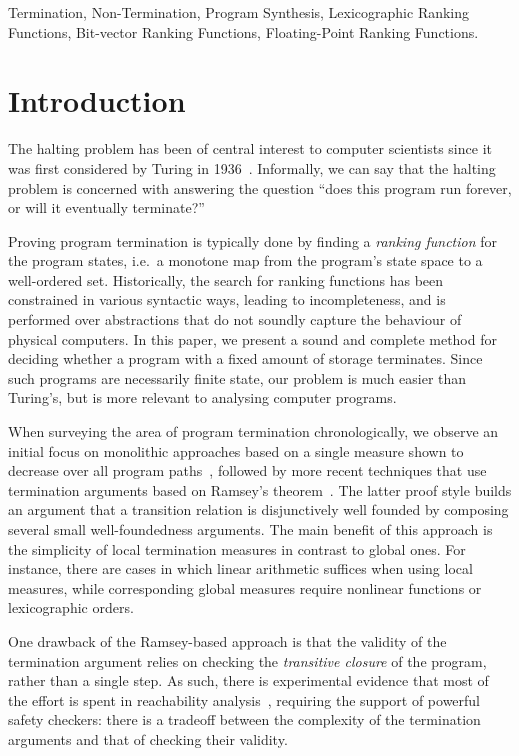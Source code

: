 \documentclass[preprint]{sigplanconf}
\theoremstyle{definition}
\begin{document}

\keywords
Termination, Non-Termination, Program Synthesis,
Lexicographic Ranking Functions, Bit-vector Ranking Functions, Floating-Point Ranking Functions.

\section{Introduction}\label{sec:intro}

The halting problem has been of central interest to computer scientists
since it was first considered by Turing in 1936~\cite{turing}.  Informally,
we can say that the halting problem is concerned with answering the question
``does this program run forever, or will it eventually terminate?''

Proving program termination is typically done by finding a \emph{ranking
function} for the program states, i.e.~a monotone map from the program's
state space to a well-ordered set.  Historically, the search for ranking
functions has been constrained in various syntactic ways, leading to
incompleteness, and is performed over abstractions that do not soundly
capture the behaviour of physical computers.  In this paper, we present a
sound and complete method for deciding whether a program with a fixed amount of
storage terminates.  Since such programs are necessarily finite state, our
problem is much easier than Turing's, but is more relevant to analysing computer
programs.

When surveying the area of program termination chronologically, we observe
an initial focus on monolithic approaches based on a single measure shown to
decrease over all program
paths~\cite{DBLP:conf/vmcai/P04,DBLP:conf/cav/BradleyMS05}, followed by more
recent techniques that use termination arguments based on Ramsey's
theorem~\cite{DBLP:conf/lpe/CodishG03,DBLP:conf/lics/PodelskiR04,DBLP:conf/pldi/CookPR06}.
The latter proof style builds an argument that a transition relation is disjunctively well founded
by composing several small well-foundedness arguments.
The main benefit of this approach is
the simplicity of local termination measures in contrast to global ones. 
For instance, there are cases in which linear arithmetic suffices when using
local measures, while corresponding global measures require nonlinear
functions or lexicographic orders.

One drawback of the Ramsey-based approach is that the validity of the
termination argument relies on checking the \emph{transitive closure} of the
program, rather than a single step.  As such, there is experimental evidence
that most of the effort is spent in reachability
analysis~\cite{DBLP:conf/pldi/CookPR06,DBLP:conf/cav/KroeningSTW10},
requiring the support of powerful safety checkers: there is a tradeoff
between the complexity of the termination arguments and that of checking
their validity.
\end{document}
